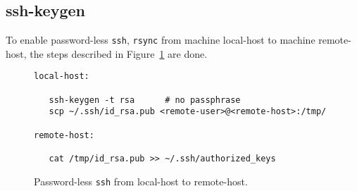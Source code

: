 \subsection{ssh-keygen}
\label{sec:sshkeygen}

To enable password-less \texttt{ssh}, \texttt{rsync} from machine local-host to machine remote-host, the steps described in Figure~\ref{fig:sshkeygen} are done.

\begin{figure}
   \scriptsize{
      \begin{lstlisting}
local-host:

   ssh-keygen -t rsa      # no passphrase
   scp ~/.ssh/id_rsa.pub <remote-user>@<remote-host>:/tmp/

remote-host:

   cat /tmp/id_rsa.pub >> ~/.ssh/authorized_keys
   \end{lstlisting}
   }
   \caption{Password-less \texttt{ssh} from local-host to remote-host.}
   \label{fig:sshkeygen}
\end{figure}
